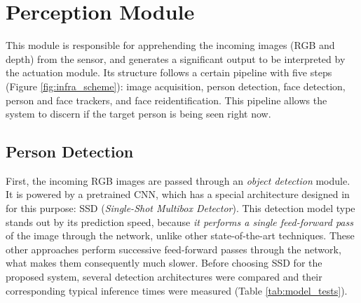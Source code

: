 \section{Perception Module}

This module is responsible for apprehending the incoming images (RGB and depth) from the sensor, and generates a significant output to be interpreted by the actuation module. Its structure follows a certain pipeline with five steps (Figure \ref{fig:infra_scheme}): image acquisition, person detection, face detection, person and face trackers, and face reidentification. This pipeline allows the system to discern if the target person is being seen right now. 

\subsection{Person Detection}

First, the incoming RGB images are passed through an \emph{object detection} module. It is powered by a pretrained CNN, which has a special architecture designed in \cite{ssd} for this purpose: SSD (\emph{Single-Shot Multibox Detector}). This detection model type stands out by its prediction speed, because \emph{it performs a single feed-forward pass} of the image through the network, unlike other state-of-the-art techniques. These other approaches perform successive feed-forward passes through the network, what makes them consequently much slower. Before choosing SSD for the proposed system, several detection architectures were compared and their corresponding typical inference times were measured (Table \ref{tab:model_tests}).

